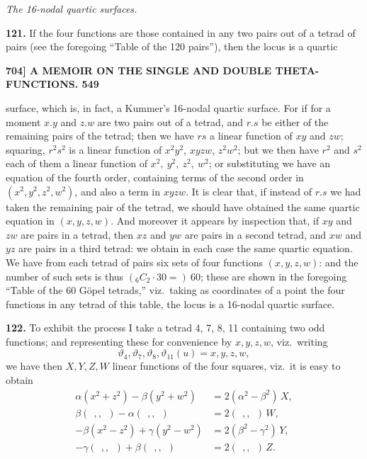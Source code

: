 \documentclass[11pt]{article}
\begin{document}
\medskip
\begin{center}\textit{The 16-nodal quartic surfaces.}\end{center}

\medskip
\textbf{121.} If the four functions are those contained in any two pairs out of a tetrad of pairs (see the foregoing ``Table of the 120 pairs''), then the locus is a quartic

\newpage
\noindent\textbf{704] \quad A MEMOIR ON THE SINGLE AND DOUBLE THETA-FUNCTIONS. \hfill 549}

\noindent surface, which is, in fact, a Kummer's 16-nodal quartic surface. For if for a moment $x.y$ and $z.w$ are two pairs out of a tetrad, and $r.s$ be either of the remaining pairs of the tetrad; then we have $rs$ a linear function of $xy$ and $zw$; squaring, $r^2s^2$ is a linear function of $x^2y^2$, $xyzw$, $z^2w^2$; but we then have $r^2$ and $s^2$ each of them a linear function of $x^2,\ y^2,\ z^2,\ w^2$; or substituting we have an equation of the fourth order, containing terms of the second order in $(x^2, y^2, z^2, w^2)$, and also a term in $xyzw$. It is clear that, if instead of $r.s$ we had taken the remaining pair of the tetrad, we should have obtained the same quartic equation in $(x, y, z, w)$. And moreover it appears by inspection that, if $xy$ and $zw$ are pairs in a tetrad, then $xz$ and $yw$ are pairs in a second tetrad, and $xw$ and $yz$ are pairs in a third tetrad: we obtain in each case the same quartic equation. We have from each tetrad of pairs six sets of four functions $(x, y, z, w)$: and the number of such sets is thus $({}_6C_2 \cdot 30 =)\ 60$; these are shown in the foregoing ``Table of the 60 G\"opel tetrads,'' viz.\ taking as coordinates of a point the four functions in any tetrad of this table, the locus is a 16-nodal quartic surface.

\medskip
\textbf{122.} To exhibit the process I take a tetrad 4, 7, 8, 11 containing two odd functions; and representing these for convenience by $x, y, z, w$, viz.\ writing
\[
\vartheta_4, \vartheta_7, \vartheta_8, \vartheta_{11}(u) = x, y, z, w,
\]
we have then $X, Y, Z, W$ linear functions of the four squares, viz.\ it is easy to obtain
\[
\begin{aligned}
\alpha(x^2 + z^2) - \beta(y^2 + w^2) &= 2(\alpha^2 - \beta^2)\,X,\\
\beta(\ \ ,, \ \ ) - \alpha(\ \ ,, \ \ ) &= 2(\ \ ,, \ \ )\,W,\\
-\beta(x^2 - z^2) + \gamma(y^2 - w^2) &= 2(\beta^2 - \gamma^2)\,Y,\\
-\gamma(\ \ ,, \ \ ) + \beta(\ \ ,, \ \ ) &= 2(\ \ ,, \ \ )\,Z.
\end{aligned}
\]
\end{document}
